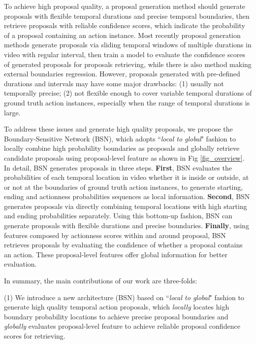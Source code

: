 \documentclass[runningheads]{llncs}
\begin{document}
To achieve high proposal quality, a proposal generation method should generate proposals with flexible temporal durations and precise temporal boundaries, then retrieve  proposals with reliable confidence scores, which indicate the probability of  a proposal containing an action instance.
Most recently proposal generation methods \cite{sst_buch_cvpr17,fast_temporal_activity_cvpr16,escorcia2016daps,shou2016action} generate proposals via sliding temporal windows of multiple durations in video with regular interval, then train a model to evaluate the confidence scores of generated proposals for proposals retrieving, while there is also method \cite{gao2017turn} making external boundaries regression.
However, proposals generated with pre-defined durations and intervals may have some major drawbacks: (1) usually not temporally precise; (2) not flexible enough to cover variable temporal durations of ground truth action instances, especially when the range of temporal durations is large.




To address these issues and generate high quality proposals, we propose the  Boundary-Sensitive Network (BSN), which adopts ``\emph{local to global}" fashion to locally combine high probability boundaries as proposals and globally retrieve candidate proposals using proposal-level feature as shown in Fig \ref{fig_overview}.
In detail, BSN generates proposals in three steps. 
{\bf First}, BSN evaluates the probabilities of each temporal location in video whether it is inside or outside, at or not at the boundaries of ground truth action instances, to generate starting, ending and actionness probabilities sequences as local information.
{\bf Second}, BSN generates proposals via directly  combining temporal locations with high starting and ending probabilities separately. Using this bottom-up fashion, BSN can generate proposals with flexible durations and precise boundaries. 
{\bf Finally}, using features composed by actionness scores within and around proposal, BSN retrieves proposals by evaluating the confidence of whether a proposal contains an action.  These proposal-level features offer global information for better evaluation.



In summary, the main contributions of our work are three-folds:



(1) We introduce a new architecture (BSN) based on ``\emph{local to global}" fashion to generate high quality temporal action proposals, which \emph{locally} locates high boundary probability locations to achieve precise proposal boundaries and \emph{globally} evaluates proposal-level feature to achieve reliable proposal confidence scores for retrieving.
\end{document}
